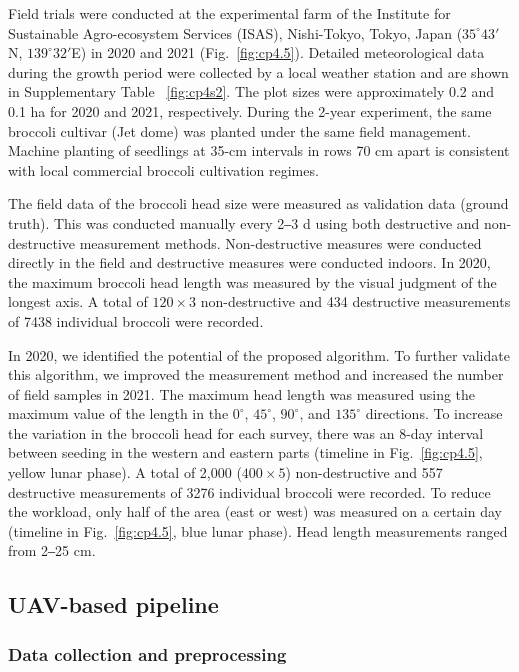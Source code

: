 Field trials were conducted at the experimental farm of the Institute for Sustainable Agro-ecosystem Services (ISAS), Nishi-Tokyo, Tokyo, Japan ($35^\circ 43'$N, $139^\circ 32'$E) in 2020 and 2021 (Fig.~\ref{fig:cp4.5}). Detailed meteorological data during the growth period were collected by a local weather station and are shown in Supplementary Table ~\ref{fig:cp4s2}. The plot sizes were approximately 0.2 and 0.1 ha for 2020 and 2021, respectively. During the 2-year experiment, the same broccoli cultivar (Jet dome) was planted under the same field management. Machine planting of seedlings at 35-cm intervals in rows 70 cm apart is consistent with local commercial broccoli cultivation regimes. 



The field data of the broccoli head size were measured as validation data (ground truth). This was conducted manually every 2‒3 d using both destructive and non-destructive measurement methods. Non-destructive measures were conducted directly in the field and destructive measures were conducted indoors. In 2020, the maximum broccoli head length was measured by the visual judgment of the longest axis. A total of $120 \times 3$ non-destructive and 434 destructive measurements of 7438 individual broccoli were recorded. 

In 2020, we identified the potential of the proposed algorithm. To further validate this algorithm, we improved the measurement method and increased the number of field samples in 2021. The maximum head length was measured using the maximum value of the length in the $0^\circ$, $45^\circ$, $90^\circ$, and $135^\circ$ directions. To increase the variation in the broccoli head for each survey, there was an 8-day interval between seeding in the western and eastern parts (timeline in Fig.~\ref{fig:cp4.5}, yellow lunar phase). A total of 2,000 ($400 \times 5$) non-destructive and 557 destructive measurements of 3276 individual broccoli were recorded. To reduce the workload, only half of the area (east or west) was measured on a certain day (timeline in Fig.~\ref{fig:cp4.5}, blue lunar phase). Head length measurements ranged from 2‒25 cm.

\subsection{UAV-based pipeline}

\subsubsection*{Data collection and preprocessing}

